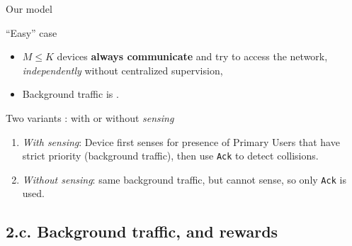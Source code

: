 \documentclass[12pt,english,ignorenonframetext,aspectratio=169,]{beamer}
\providecommand{\tightlist}{%
  \setlength{\itemsep}{0pt}\setlength{\parskip}{0pt}}
\begin{document}
\begin{frame}[fragile]{Our model}

\begin{block}{``Easy'' case}

\begin{itemize}\tightlist
\item
  \(M \leq K\) devices \textbf{always communicate} and try to access the
  network, \emph{independently} without centralized supervision,
\item
  Background traffic is \iid.
\end{itemize}

\end{block}

\pause

\begin{block}{Two variants : with or without \emph{sensing}}

\begin{enumerate}
\def\labelenumi{\arabic{enumi}.}
\tightlist
\item
  \emph{With sensing}: Device first senses for presence of Primary Users that have strict priority
  (background traffic), then use \texttt{Ack} to detect collisions.
\item
  \emph{Without sensing}: same background traffic, but cannot sense, so
  only \texttt{Ack} is used.
\end{enumerate}

\end{block}

\end{frame}



\subsection{\hfill{}2.c. Background traffic, and rewards\hfill{}}
\end{document}
